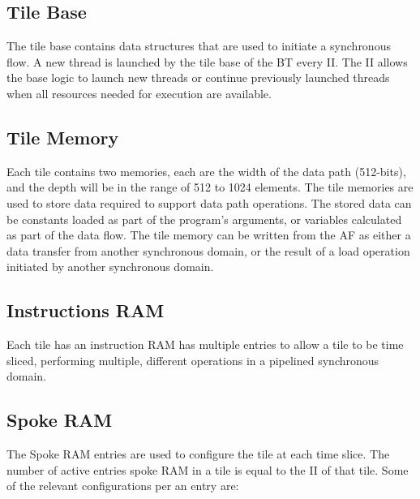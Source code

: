 \subsection{Tile Base}
The tile base contains data structures that are used to initiate a synchronous flow.
A new thread is launched by the tile base of the BT every II.
The II allows the base logic to launch new threads or continue previously launched threads when all resources needed for execution are available.

\subsection{Tile Memory}
Each tile contains two memories, each are the width of the data path (512-bits), and the depth will be in the range of 512 to 1024 elements.
The tile memories are used to store data required to support data path operations.
The stored data can be constants loaded as part of the program's arguments, or variables calculated as part of the data flow.
The tile memory can be written from the AF as either a data transfer from another synchronous domain, or the result of a load operation
initiated by another synchronous domain.

\subsection{Instructions RAM}
Each tile has an instruction RAM has multiple entries to allow a tile to be time sliced, performing multiple, different operations in a pipelined synchronous domain.

\subsection{Spoke RAM}
The Spoke RAM entries are used to configure the tile at each time slice.
The number of active entries spoke RAM in a tile is equal to the II of that tile.
Some of the relevant configurations per an entry are: 

